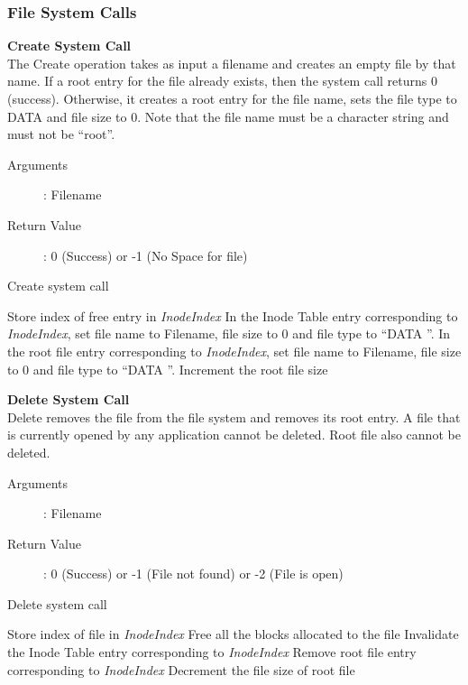 \documentclass[10pt]{article}
\begin{document}
\subsubsection{File System Calls}
\textbf{Create System Call}
\vspace{3mm}\\
The Create operation takes as input a filename and creates an empty file by that name. If a root entry for the file already exists, then the system call returns 0 (success). Otherwise, it creates a root entry for the file name, sets the file type to DATA and file size to 0. Note that the file name must be a character string and must not be “root”. 
\begin{description}
\item[Arguments]: Filename
\item[Return Value]: 0 (Success) or -1 (No Space for file)
\end{description}
\vspace{3mm}
\begin{algorithm}
\caption{Create system call}
\begin{algorithmic}
\ENDIF    
{}
\ELSE
    \STATE Store index of free entry in \textit{InodeIndex}
\ENDIF   
\STATE In the Inode Table entry corresponding to \textit{InodeIndex}, set file name to Filename, file size to 0 and file type to “DATA ”.
\STATE In the root file entry corresponding to \textit{InodeIndex}, set file name to Filename, file size to 0 and file type to “DATA ”.
\STATE Increment the root file size
\end{algorithmic}
\end{algorithm}
\textbf{Delete System Call}
\vspace{3mm}\\
Delete removes the file from the file system and removes its root entry. A file that is currently opened by any application cannot be deleted. Root file also cannot be deleted.
\begin{description}
	\item[Arguments]: Filename
	\item[Return Value]: 0 (Success) or -1 (File not found) or -2 (File is open)
\end{description} 
\begin{algorithm}
\caption{Delete system call}
\begin{algorithmic}
\ELSE
    \STATE Store index of file in \textit{InodeIndex}
\ENDIF    
{}
\ENDIF
\STATE Free all the blocks allocated to the file
\STATE Invalidate the Inode Table entry corresponding to \textit{InodeIndex}
\STATE Remove root file entry corresponding to \textit{InodeIndex}
\STATE Decrement the file size of root file
\end{algorithmic}
\end{algorithm}
\end{document}
